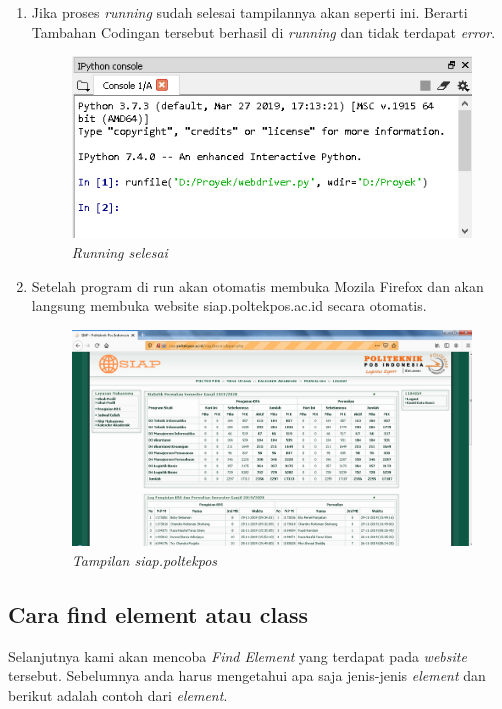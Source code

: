 \begin{enumerate}
\item Jika proses \textit{running} sudah selesai tampilannya akan seperti ini. Berarti Tambahan Codingan tersebut berhasil di \textit{running} dan tidak terdapat \textit{error}.
\begin{figure}[H]
    	\centering
    	\includegraphics[scale=0.5]{Figures/figures/run4.png}
    	\caption{\textit{Running selesai}}
    	\label{CLI}
	\end{figure}

\item Setelah program di run akan otomatis membuka Mozila Firefox dan akan langsung membuka website siap.poltekpos.ac.id secara otomatis.
\begin{figure}[H]
    	\centering
    	\includegraphics[scale=0.3]{Figures/figures/run5.png}
    	\caption{\textit{Tampilan siap.poltekpos}}
    	\label{CLI}
	\end{figure}


\end{enumerate}

\subsection{Cara find element atau class }
\par Selanjutnya kami akan mencoba \textit{Find Element} yang terdapat pada \textit{website} tersebut. Sebelumnya anda harus mengetahui apa saja jenis-jenis \textit{element} dan berikut adalah contoh dari \textit{element}.

